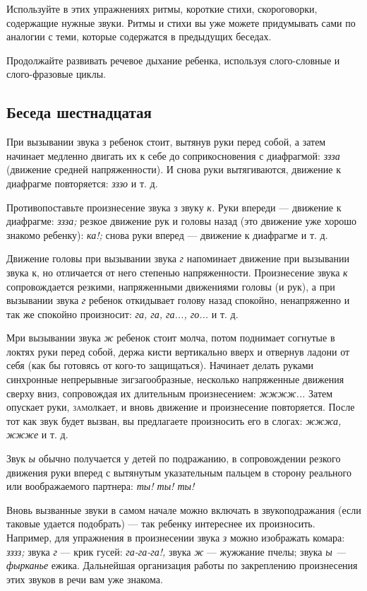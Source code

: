 \documentclass[a5paper]{book}
\renewcommand{\emph}[1]{\textit{#1}}
\begin{document}
Используйте в этих упражнениях ритмы, короткие стихи, скороговорки,
содержащие нужные звуки. Ритмы и стихи вы уже можете придумывать сами по
аналогии с теми, которые содержатся в предыдущих беседах.

Продолжайте развивать речевое дыхание ребенка, используя слого-словные и
слого-фразовые циклы.

\subsection*{Беседа шестнадцатая}

При вызывании звука з ребенок стоит, вытянув руки перед собой, а затем
начинает медленно двигать их к себе до соприкосновения с диафрагмой:
\emph{ззза} (движение средней напряженности). И снова руки вытягиваются,
движение к диафрагме повторяется: \emph{зззо} и т. д.

Противопоставьте произнесение звука з звуку \emph{к.} Руки впереди ---
движение к диафрагме: \emph{ззза;} резкое движение рук и головы назад
(это движение уже хорошо знакомо ребенку): \emph{ка!;} снова руки вперед
--- движение к диафрагме и т. д.

Движение головы при вызывании звука \emph{г} напоминает движение при
вызывании звука к, но отличается от него степенью напряженности.
Произнесение звука \emph{к} сопровождается резкими, напряженными
движениями головы (и рук), а при вызывании звука \emph{г} ребенок
откидывает голову назад спокойно, ненапряженно и так же спокойно
произносит: \emph{га, га, га..., го...} и т. д.

Мри вызывании звука \emph{ж} ребенок стоит молча, потом поднимает
согнутые в локтях руки перед собой, держа кисти вертикально вверх и
отвернув ладони от себя (как бы готовясь от кого-то защищаться).
Начинает делать руками синхронные непрерывные зигзагообразные, несколько
напряженные движения сверху вниз, сопровождая их длительным
произнесением: \emph{жжжж...} Затем опускает руки, \textsc{зам}олкает, и
вновь движение и произнесение повторяется. После тот как звук будет
вызван, вы предлагаете произносить его в слогах: \emph{жжжа, жжже} и т.
д.

Звук \emph{ы} обычно получается у детей по подражанию, в сопровождении
резкого движения руки вперед с вытянутым указательным пальцем в сторону
реального или воображаемого партнера: \emph{ты! ты! ты!}

Вновь вызванные звуки в самом начале можно включать в звукоподражания
(если таковые удается подобрать) --- так ребенку интереснее их
произносить. Например, для упражнения в произнесении звука \emph{з}
можно изображать комара: \emph{зззз;} звука \emph{г} --- крик гусей:
\emph{га-га-га!,} звука \emph{ж} --- жужжание пчелы; звука \emph{ы ---
фырканье} ежика. Дальнейшая организация работы по закреплению
произнесения этих звуков в речи вам уже знакома.
\end{document}
